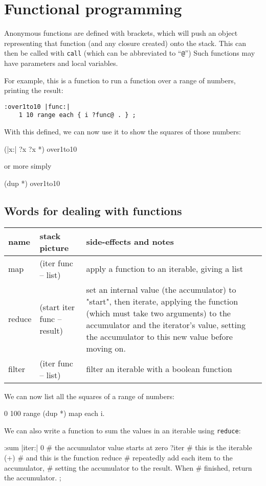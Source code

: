 \section{Functional programming}
Anonymous functions are defined with brackets, which will push an object
representing that function (and any closure created) onto the stack. This can
then be called with \texttt{call}  (which can be abbreviated to ``\texttt{@}'')
Such functions may have parameters and local variables.

For example, this is a function to run a function over a range of numbers,
printing the result:

\begin{lstlisting}
:over1to10 |func:|
    1 10 range each { i ?func@ . } ;
\end{lstlisting}
With this defined, we can now use it to show the squares of those
numbers:        
\begin{v}
    (|x:| ?x ?x *) over1to10
\end{v}
or more simply
\begin{v}
    (dup *) over1to10
\end{v}

\subsection{Words for dealing with functions}
\begin{center}
\begin{tabular}{|l|l|p{4in}|}\hline
\textbf{name} & \textbf{stack picture} & \textbf{side-effects and notes}\\ \hline
map &(iter func -- list) & apply a function to an iterable, giving a list\\
reduce & (start iter func -- result) & set an internal value (the accumulator) to "start", then iterate, applying the function (which must take two arguments) to the accumulator and the iterator's value, setting the accumulator to this new value before moving on.\\
filter & (iter func -- list) & filter an iterable with a boolean function\\
\hline
\end{tabular}
\end{center}
We can now list all the squares of a range of numbers:
\begin{v}
0 100 range (dup *) map each {i.}
\end{v}


We can also write a function to sum the values in an iterable using
\texttt{reduce}:
\begin{v}
:sum |iter:|
    0           # the accumulator value starts at zero
    ?iter       # this is the iterable
    (+)         # and this is the function 
    reduce      # repeatedly add each item to the accumulator,
                # setting the accumulator to the result. When
                # finished, return the accumulator.
;
\end{v}



